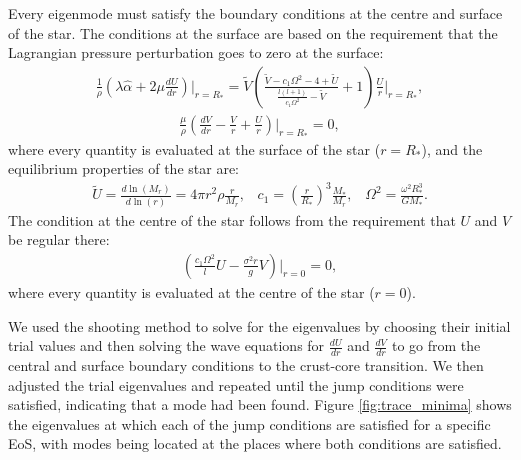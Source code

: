 \documentclass[fleqn,usenatbib]{mnras}
\begin{document}
\hspace{\parindent}Every eigenmode must satisfy the boundary conditions at the centre and surface of the star. The conditions at the surface are based on the requirement that the Lagrangian pressure perturbation goes to zero at the surface:
\begin{align}
\frac{1}{\rho}\left(\lambda\hat{\alpha}+2\mu\frac{dU}{dr}\right)\biggr\rvert_{r=R_{*}}=\tilde{V}\left(\frac{\tilde{V}-c_1\Omega^2-4+\tilde{U}}{\frac{l(l+1)}{c_1\Omega^2}-\tilde{V}}+1\right)\frac{U}{r}\biggr\rvert_{r=R_{*}},
\label{eq:surface_boundary_modified_1}
\end{align}
\begin{align}
\frac{\mu}{\rho}\left(\frac{dV}{dr}-\frac{V}{r}+\frac{U}{r}\right)\biggr\rvert_{r=R_{*}}=0,
\label{eq:surface_boundary_modified_2}
\end{align}
\noindent where every quantity is evaluated at the surface of the star ($r=R_*$), and the equilibrium properties of the star are: 
\begin{align}\nonumber
\tilde{U}=\frac{d\ln\left(M_r\right)}{d\ln\left(r\right)}=4\pi r^2\rho\frac{r}{M_r},\;\;\;c_1=\left(\frac{r}{R_*}\right)^3\frac{M_*}{M_r},\;\;\;\Omega^2=\frac{\omega^2R_*^3}{GM_*}.
\end{align}
\noindent The condition at the centre of the star follows from the requirement that $U$ and $V$ be regular there:
\begin{align}
\left(\frac{c_1\Omega^2}{l}U-\frac{\sigma^2r}{g}V\right)\biggr\rvert_{r=0}=0,
\label{eq:core_condition}
\end{align}
\noindent where every quantity is evaluated at the centre of the star ($r=0$).


\hspace{\parindent}We used the shooting method to solve for the eigenvalues by choosing their initial trial values and then solving the wave equations for $\frac{dU}{dr}$ and $\frac{dV}{dr}$ to go from the central and surface boundary conditions to the crust-core transition. We then adjusted the trial eigenvalues and repeated until the jump conditions were satisfied, indicating that a mode had been found. Figure \ref{fig:trace_minima} shows the eigenvalues at which each of the jump conditions are satisfied for a specific EoS, with modes being located at the places where both conditions are satisfied.
\end{document}
